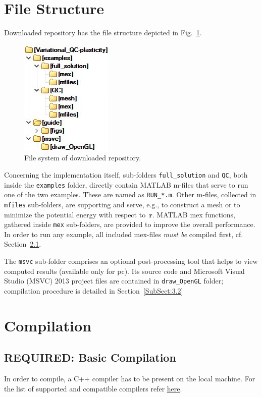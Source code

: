 \documentclass[preprint,12pt,authoryear]{elsarticle}
\newcommand{\bs}[1]{{\boldsymbol{#1}}}
\begin{document}
\section{File Structure}
\label{Sect:2}
%
Downloaded repository has the file structure depicted in Fig.~\ref{Sect:2:Fig:1}.
%
\begin{figure}[h!]
	\centering
	\includegraphics[scale=0.75]{figs/folders.jpg}
	\caption{File system of downloaded repository.}
	\label{Sect:2:Fig:1}
\end{figure}
%

Concerning the implementation itself, sub-folders \texttt{full\_solution} and \texttt{QC}, both inside the \texttt{examples} folder, directly contain MATLAB m-files that serve to run one of the two examples. These are named as \texttt{RUN\_*.m}. Other m-files, collected in \texttt{mfiles} sub-folders, are supporting and serve, e.g., to construct a mesh or to minimize the potential energy with respect to~$\bs{r}$. MATLAB mex functions, gathered inside \texttt{mex} sub-folders, are provided to improve the overall performance. In order to run any example, all included mex-files \emph{must be} compiled first, cf. Section~\ref{SubSect:3.1}.

The \texttt{msvc} sub-folder comprises an optional post-processing tool that helps to view computed results (available only for pc). Its source code and Microsoft Visual Studio (MSVC) 2013 project files are contained in \texttt{draw\_OpenGL} folder; compilation procedure is detailed in Section~\ref{SubSect:3.2} 
%
%
\section{Compilation}
\label{Sect:3}
%
%
\subsection{REQUIRED: Basic Compilation}
\label{SubSect:3.1}
%
In order to compile, a C++ compiler has to be present on the local machine. For the list of supported and compatible compilers refer \href{https://www.mathworks.com/support/compilers/}{here}.
\end{document}
